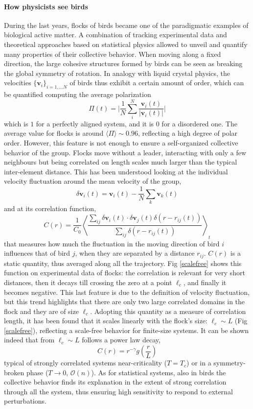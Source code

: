 \paragraph*{How physicists see birds}
During the last years, flocks of birds became one of the paradigmatic examples of biological active matter. A combination of tracking experimental data and theoretical approaches based on statistical physics allowed to unveil and quantify many properties of their collective behavior. When moving along a fixed direction, 
the large cohesive structures formed by birds can be seen as breaking the global symmetry of rotation.
In analogy with liquid crystal physics, the velocities $\{\bm v_i\}_{i = 1,...N}$ of birds 
thus exhibit a certain amount of order,
which can be quantified computing the average polarization
\begin{equation}
 \Pi(t) = \Big | \frac{1}{N} \sum_{i}^N \frac{\bm v_i(t)}{|\bm v_i(t)|} \Big |
\end{equation}
which is $1$ for a perfectly aligned system, and it is $0$ for a disordered one.
The average value for flocks is around $\langle \Pi \rangle \sim 0.96$, reflecting a high degree of polar order. However, this feature is not enough to ensure a self-organized collective behavior of the group. Flocks move without a leader, interacting with only a few neighbours but being correlated on length scales much larger than the typical inter-element distance. This has been understood looking at the individual velocity fluctuation around the mean velocity of the group,
$$
\delta \bm v_i (t) = \bm v_i(t) - \frac{1}{N} \sum_k \bm v_k(t)
$$
and at its correlation function,
\begin{equation}
 C(r) = \frac{1}{C_0} \left\langle \frac{\sum_{ij} \delta \bm v_i(t) \cdot \delta \bm v_j(t) \delta(r-r_{ij}(t))}{\sum_{ij} \delta(r-r_{ij}(t))} \right\rangle_t
\end{equation}
that measures how much the fluctuation in the moving direction of bird $i$ influences that of bird $j$, when they are separated by a distance $r_{ij}$. $C(r)$ is a static quantity, thus averaged along all the trajectory. Fig \ref{scalefree} shows this function on experimental data of flocks: the correlation is relevant for very short distances, then it decays till crossing the zero at a point $\ell_c$, and finally it becomes negative. This last feature is due to the definition of velocity fluctuation, but this trend highlights that there are only two large correlated domains in the flock and they are of size $\ell_c$. Adopting this quantity as a measure of correlation length, it has been found that it scales linearly with the flock's size: $\ell_c \sim L$ (Fig \ref{scalefree}), reflecting a scale-free behavior for finite-size systems. It can be shown indeed that from $\ell_c \sim L$ follows a power law decay,
$$
C(r) = r^{-\gamma} g \left( \frac{r}{L}\right)
$$
typical of strongly correlated systems near-criticality ($T=T_c$) or in a symmetry-broken phase ($T\to 0$, $\mathcal O(n)$).
As for statistical systems, also in birds the collective behavior finds its explanation in the extent of strong correlation through all the system, thus ensuring high sensitivity to respond to external perturbations.

